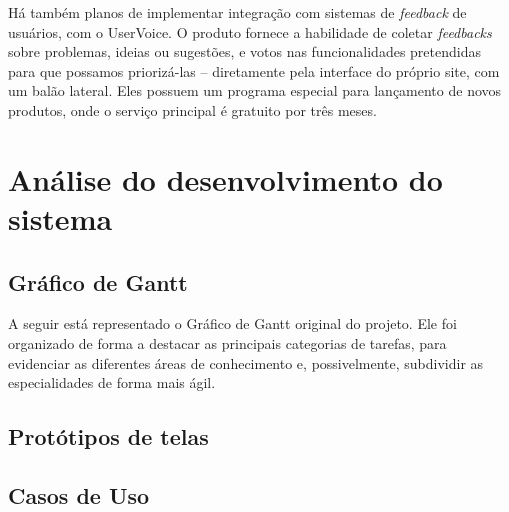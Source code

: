 \documentclass[12pt,a4paper,twoside,hyphens,english,brazil]{abntex2}
\begin{document}
{Há também planos de implementar integração com sistemas de \emph{feedback} de usuários, com o UserVoice. O produto fornece a habilidade de coletar \emph{feedbacks} sobre problemas, ideias ou sugestões, e votos nas funcionalidades pretendidas para que possamos priorizá-las -- diretamente pela interface do próprio site, com um balão lateral\cite{uservoice-product}. Eles possuem um programa especial para lançamento de novos produtos, onde o serviço principal é gratuito por três meses\cite{uservoice-launch}.


\section{Análise do desenvolvimento do sistema}

\subsection{Gráfico de Gantt}
A seguir está representado o Gráfico de Gantt original do projeto. Ele foi organizado de forma a destacar as principais categorias de tarefas, para evidenciar as diferentes áreas de conhecimento e, possivelmente, subdividir as especialidades de forma mais ágil.




\subsection{Protótipos de telas}

\subsection{Casos de Uso}
\newcommand\pad[1] {\expandafter\realpad\csname c@#1\endcsname}
\newcommand\realpad[1] {%
	\ifnum #1<10 0\fi%
	\number#1%
}
\renewcommand{\theUC} {[UC-\pad{UC}]}
\DeclareRobustCommand{\UC} {%
	\refstepcounter{UC}%
	\theUC%
}

}
\end{document}
